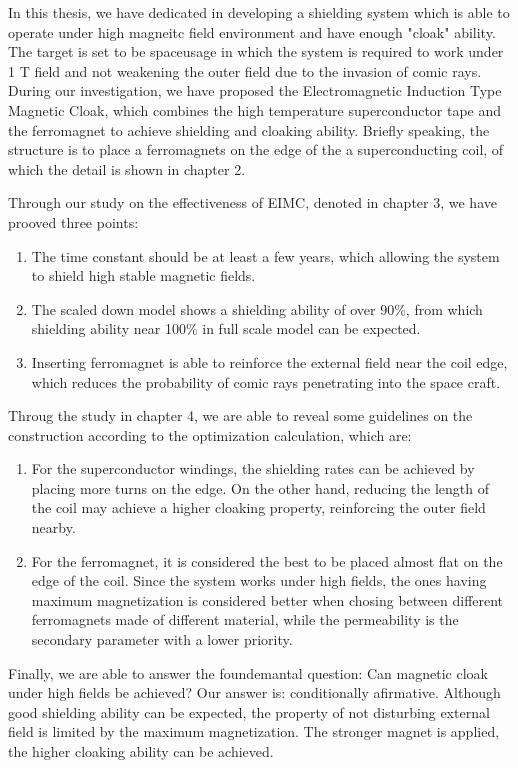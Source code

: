 In this thesis, we have dedicated in developing a shielding system which is able to operate under high magneitc field environment and have enough "cloak" ability.
The target is set to be spaceusage in which the system is required to work under 1 T field and not weakening the outer field due to the invasion of comic rays.
During our investigation,
we have proposed the Electromagnetic Induction Type Magnetic Cloak,
which combines the high temperature superconductor tape and the ferromagnet to achieve shielding and cloaking ability.
Briefly speaking, the structure is to place a ferromagnets on the edge of the a superconducting coil,
of which the detail is shown in chapter 2.

Through our study on the effectiveness of EIMC, denoted in chapter 3,
we have prooved three points:
\begin{enumerate}
  \item The time constant should be at least a few years, which allowing the system to shield high stable magnetic fields.
  \item The scaled down model shows a shielding ability of over 90\%, from which shielding ability near 100\% in full scale model can be expected.
  \item Inserting ferromagnet is able to reinforce the external field near the coil edge, which reduces the probability of comic rays penetrating into the space craft.
\end{enumerate}
Throug the study in chapter 4, we are able to reveal some guidelines on the construction according to the optimization calculation, which are:
\begin{enumerate}
  \item For the superconductor windings, the shielding rates can be achieved by placing more turns on the edge. On the other hand,
  reducing the length of the coil may achieve a higher cloaking property,
  reinforcing the outer field nearby.
  \item For the ferromagnet, it is considered the best to be placed almost flat on the edge of the coil.
  Since the system works under high fields, the ones having maximum magnetization is considered better when chosing between different ferromagnets made of different material,
  while the permeability is the secondary parameter with a lower priority.
\end{enumerate}

Finally, we are able to answer the foundemantal question:
Can magnetic cloak under high fields be achieved?
Our answer is: conditionally afirmative.
Although good shielding ability can be expected, the property of not disturbing external field is limited by the maximum magnetization.
The stronger magnet is applied, the higher cloaking ability can be achieved.
